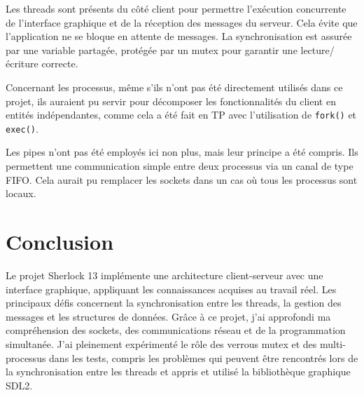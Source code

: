 \documentclass{article}
\begin{document}
Les threads sont présents du côté client pour permettre l'exécution concurrente de l'interface graphique et de la réception des messages du serveur. Cela évite que l'application ne se bloque en attente de messages. La synchronisation est assurée par une variable partagée, protégée par un mutex pour garantir une lecture/écriture correcte.

Concernant les processus, même s'ils n'ont pas été directement utilisés dans ce projet, ils auraient pu servir pour décomposer les fonctionnalités du client en entités indépendantes, comme cela a été fait en TP avec l'utilisation de \texttt{fork()} et \texttt{exec()}.

Les pipes n'ont pas été employés ici non plus, mais leur principe a été compris. Ils permettent une communication simple entre deux processus via un canal de type FIFO. Cela aurait pu remplacer les sockets dans un cas où tous les processus sont locaux.

\section{Conclusion}

Le projet Sherlock 13 implémente une architecture client-serveur avec une interface graphique, appliquant les connaissances acquises au travail réel. 
Les principaux défis concernent la synchronisation entre les threads, la gestion des messages et les structures de données. 
Grâce à ce projet, j'ai approfondi ma compréhension des sockets, des communications réseau et de la programmation simultanée. 
J'ai pleinement expérimenté le rôle des verrous mutex et des multi-processus dans les tests, compris les problèmes qui peuvent être rencontrés lors de la synchronisation entre les threads 
et appris et utilisé la bibliothèque graphique SDL2.
\end{document}
